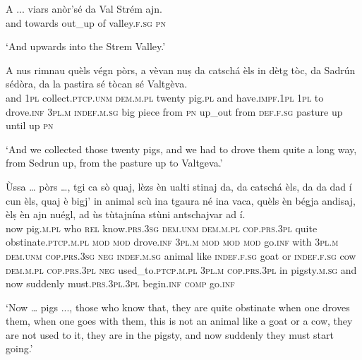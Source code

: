 \begin{linenumbers}
	\gll    A ... viars anòr’sé da Val Strém ajn.\\
	and {} towards out\_up of valley.\textsc{f.sg} \textsc{pn}\\
\end{linenumbers}
\medskip
\glt `And upwards into the Strem Valley.'
\medskip

\begin{linenumbers}
	\gll    A nus rimnau quèls végn pòrs, a vèvan nuṣ da catschá èls in dètg tòc, da Sadrún sédòra, da la pastira sé tòcan sé Valtgèva.\\
	and \textsc{1pl} collect.\textsc{ptcp.unm}  \textsc{dem.m.pl} twenty pig.\textsc{pl} and have.\textsc{impf.1pl} \textsc{1pl} to drove.\textsc{inf} \textsc{3pl.m} \textsc{indef.m.sg} big piece from \textsc{pn} up\_out from \textsc{def.f.sg}  pasture up until up \textsc{pn}\\
\end{linenumbers}
\medskip
\glt `And we collected those twenty pigs, and we had to drove them quite a long way, from Sedrun up, from the pasture up to Valtgeva.'
\medskip

\begin{linenumbers}
	\gll    Ùssa … pòrs …, tgi ca sò quaj, lèzs èn ualti stinaj da, da catschá èls, da da dad í cun èls, quaj è bigj’ in animal scù ina tgaura né ina vaca, quèls èn bégja andisaj, èlṣ èn ajn nuégl, ad ùs tùtajnína stùni antschajvar ad í.\\
	now {} pig.\textsc{m.pl} {} who \textsc{rel}  know.\textsc{prs.3sg} \textsc{dem.unm} \textsc{dem.m.pl} \textsc{cop.prs.3pl} quite obstinate.\textsc{ptcp.m.pl} \textsc{mod} \textsc{mod} drove.\textsc{inf} \textsc{3pl.m} \textsc{mod} \textsc{mod} \textsc{mod} go.\textsc{inf} with \textsc{3pl.m} \textsc{dem.unm} \textsc{cop.prs.3sg} \textsc{neg} \textsc{indef.m.sg} animal like \textsc{indef.f.sg} goat or \textsc{indef.f.sg} cow  \textsc{dem.m.pl} \textsc{cop.prs.3pl} \textsc{neg} used\_to.\textsc{ptcp.m.pl} \textsc{3pl.m} \textsc{cop.prs.3pl} in pigsty.\textsc{m.sg} and now suddenly must.\textsc{prs.3pl.3pl} begin.\textsc{inf} \textsc{comp} go.\textsc{inf}\\
\end{linenumbers}
\medskip
\glt `Now … pigs ..., those who know that, they are quite obstinate when one droves them, when one goes with them, this is not an animal like a goat or a cow, they are not used to it, they are in the pigsty, and now suddenly they must start going.'
\medskip

